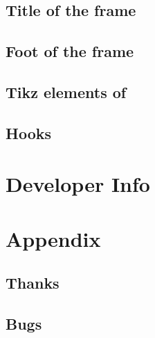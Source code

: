 \documentclass[openany,12pt,tocdepth=3,showframe]{ltx-md}
\begin{document}
\section{Title of the frame}\label{sec:element-firsttitle}

\section{Foot of the frame}\label{sec:element-lastfoot}



\section{Tikz elements of  \texorpdfstring{}{xframed}}


\section{Hooks}\label{sec:hook}

\label{se:tikzsetup}

\chapter{Developer Info}\label{chap:developer-info}


\chapter{Appendix}\label{chap:appendix}
\section{Thanks}

\section{Bugs}
\end{document}
